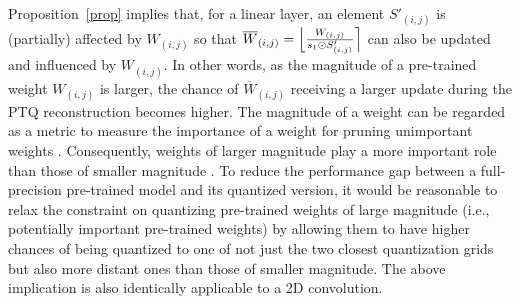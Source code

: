 \documentclass{article}
\theoremstyle{plain}
\theoremstyle{definition}
\theoremstyle{remark}
\begin{document}
Proposition~\ref{prop} implies that, for a linear layer, an element $S'_{(i, j)}$ is (partially) affected by $W_{(i, j)}$ so that $\overline{W}_{(i, j)} = \Big\lfloor{W_{(i, j)} \over {s_1 \odot S'_{(i, j)}}}\Big\rceil$ can also be updated and influenced by $W_{(i, j)}$.
In other words, as the magnitude of a pre-trained weight $W_{(i, j)}$ is larger, the chance of $\overline{W}_{(i, j)}$ receiving a larger update during the PTQ reconstruction becomes higher. The magnitude of a weight can be regarded as a metric to measure the importance of a weight for pruning unimportant weights \citep{han2015learning}. Consequently, weights of larger magnitude play a more important role than those of smaller magnitude \citep{han2016deep}.
To reduce the performance gap between a full-precision pre-trained model and its quantized version, it would be reasonable to relax the constraint on quantizing pre-trained weights of large magnitude (i.e., potentially important pre-trained weights) by allowing them to have higher chances of being quantized to one of not just the two closest quantization grids but also more distant ones than those of smaller magnitude.
The above implication is also identically applicable to a 2D convolution.
\end{document}
